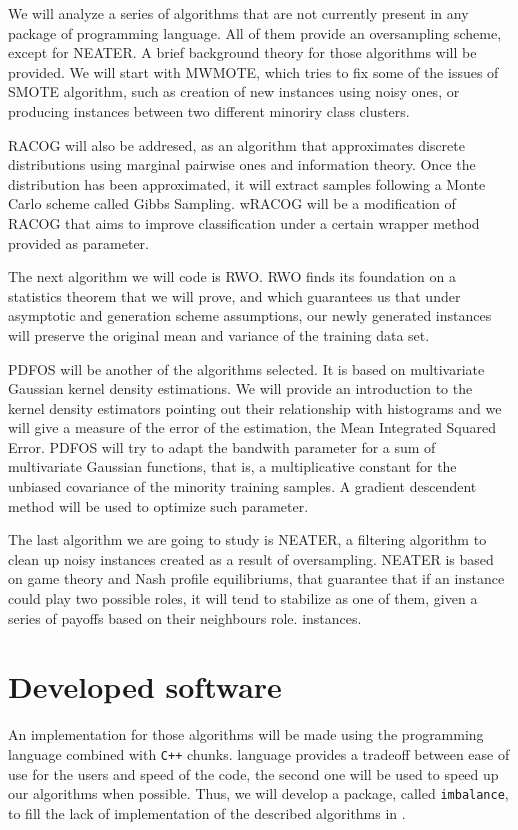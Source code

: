 We will analyze a series of algorithms that are not currently present in any package of \R programming language. All of
them provide an oversampling scheme, except for NEATER. A brief background theory for those algorithms will be provided.
We will start with MWMOTE, which tries to fix some of the issues of SMOTE algorithm, such as creation of new instances 
using noisy ones, or producing instances between two different minoriry class clusters.

RACOG will also be addresed, as an algorithm that approximates discrete distributions using marginal pairwise ones and 
information theory. Once the distribution has been approximated, it will extract samples following a Monte Carlo scheme
called Gibbs Sampling. wRACOG will be a modification of RACOG that aims to improve classification under a certain wrapper
method provided as parameter.

The next algorithm we will code is RWO. RWO finds its foundation on a statistics theorem that we will prove, and which guarantees
us that under asymptotic and generation scheme assumptions, our newly generated instances will preserve the original mean
and variance of the training data set.

PDFOS will be another of the algorithms selected. It is based on multivariate Gaussian kernel density estimations. We will
provide an introduction to the kernel density estimators pointing out their relationship with histograms and we will give
a measure of the error of the estimation, the Mean Integrated Squared Error. PDFOS will try to adapt the bandwith parameter
for a sum of multivariate Gaussian functions, that is, a multiplicative constant for the unbiased covariance of the minority
training samples. A gradient descendent method will be used to optimize such parameter.

The last algorithm we are going to study is NEATER, a filtering algorithm to clean up noisy instances created as a result of
oversampling. NEATER is based on game theory and Nash profile equilibriums, that guarantee that if an instance could play
two possible roles, it will tend to stabilize as one of them, given a series of payoffs based on their neighbours role.
instances.

\section*{Developed software}
An implementation for those algorithms will be made using the \R programming language combined with \texttt{C++} chunks. 
\R language provides a tradeoff between ease of use for the users and speed of the code, the second one will be used to 
speed up our algorithms when possible. Thus, we will develop a package, called \texttt{imbalance}, to fill the lack of implementation of the 
described algorithms in \R.

